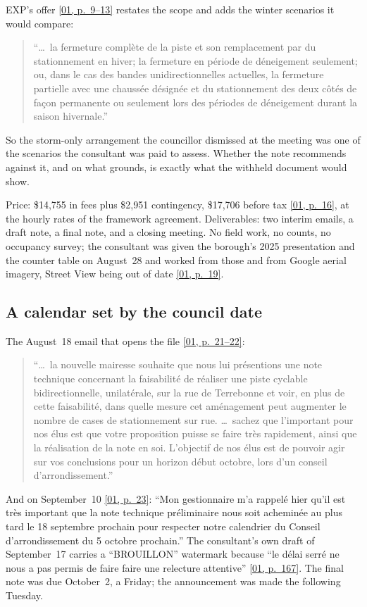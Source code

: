 \documentclass[11pt,letterpaper]{article}
\newcommand{\pagesurl}{https://openmobilitydata.github.io/Terrebonne-access-requests}
\newcommand{\pgl}[3]{\href{\pagesurl/\csname bundle#1\endcsname\#page=#2}{\textsf{\small[#1, p.~#3]}}}
\newcommand{\pg}[2]{\pgl{#1}{#2}{#2}}
\newcommand{\quot}[1]{\begin{quote}\small #1\end{quote}}
\begin{document}
EXP's offer \pgl{01}{9}{9--13} restates the scope and adds the winter scenarios
it would compare:

\quot{``\ldots\ la fermeture compl\`ete de la piste et son remplacement par du
stationnement en hiver; la fermeture en p\'eriode de d\'eneigement seulement;
ou, dans le cas des bandes unidirectionnelles actuelles, la fermeture
partielle avec une chauss\'ee d\'esign\'ee et du stationnement des deux c\^ot\'es
de fa\c{c}on permanente ou seulement lors des p\'eriodes de d\'eneigement
durant la saison hivernale.''}

So the storm-only arrangement the councillor dismissed at the meeting was one
of the scenarios the consultant was paid to assess. Whether the note
recommends against it, and on what grounds, is exactly what the withheld
document would show.

Price: \$14{,}755 in fees plus \$2{,}951 contingency, \$17{,}706 before tax
\pg{01}{16}, at the hourly rates of the framework agreement. Deliverables:
two interim emails, a draft note, a final note, and a closing meeting. No
field work, no counts, no occupancy survey; the consultant was given the
borough's 2025 presentation and the counter table on August~28 and worked
from those and from Google aerial imagery, Street View being out of date
\pg{01}{19}.

\subsection{A calendar set by the council date}

The August~18 email that opens the file \pgl{01}{21}{21--22}:

\quot{``\ldots\ la nouvelle mairesse souhaite que nous lui pr\'esentions une note
technique concernant la faisabilit\'e de r\'ealiser une piste cyclable
bidirectionnelle, unilat\'erale, sur la rue de Terrebonne et voir, en plus de
cette faisabilit\'e, dans quelle mesure cet am\'enagement peut augmenter le
nombre de cases de stationnement sur rue. \ldots\ sachez que l'important
pour nos \'elus est que votre proposition puisse se faire tr\`es rapidement,
ainsi que la r\'ealisation de la note en soi. L'objectif de nos \'elus est de
pouvoir agir sur vos conclusions pour un horizon d\'ebut octobre, lors d'un
conseil d'arrondissement.''}

And on September~10 \pg{01}{23}: ``Mon gestionnaire m'a rappel\'e hier qu'il
est tr\`es important que la note technique pr\'eliminaire nous soit achemin\'ee
au plus tard le 18 septembre prochain pour respecter notre calendrier du
Conseil d'arrondissement du 5 octobre prochain.'' The consultant's own draft
of September~17 carries a ``BROUILLON'' watermark because ``le d\'elai serr\'e
ne nous a pas permis de faire faire une relecture attentive'' \pg{01}{167}.
The final note was due October~2, a Friday; the announcement was made the
following Tuesday.
\end{document}
